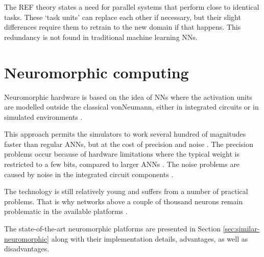 \documentclass[report.tex]{subfiles}
\begin{document}
The \gls{REF} theory states a need for parallel systems that perform close to
identical tasks.
These `task units' can replace each other if necessary, but their slight 
differences require them to retrain to the new domain if that happens.
This redundancy is not found in traditional machine learning \glspl{NN}.

\section{Neuromorphic computing}
Neuromorphic hardware is based on the idea of \glspl{NN} where the activation
units are modelled outside the classical \gls{vonNeumann}, either in 
integrated circuits or in simulated environments \cite{Albada2018,Blundell2018,Schmitt2017}.

This approach permits the simulators to work several hundred of magnitudes
faster than regular \gls{ANN}s, but at the cost of precision and noise
\cite{Indiveri2015, Schmitt2017}.
The precision problems occur because of hardware limitations where the typical
weight is restricted to a few bits, compared to larger \glspl{ANN}
\cite{Indiveri2015, Lin2018}.
The noise problems are caused by noise in the integrated circuit components 
\cite{Lin2018, Pfeil2013}.

The technology is still relatively young and suffers from a number
of practical problems. That is why networks above a couple of thousand neurons remain
problematic in the available platforms \cite{Schmitt2017}.


The state-of-the-art neuromorphic platforms are presented in Section
\ref{sec:similar-neuromorphic} along with their implementation details,
advantages, as well as disadvantages.

\end{document}
